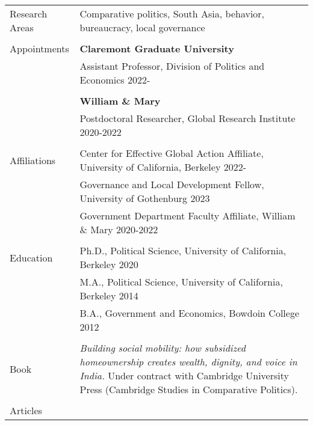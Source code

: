 \documentclass[letterpaper, 10.5pt]{article}
\begin{document}
\begin{longtable}{p{1.5in}p{5in}}

Research Areas & Comparative politics, South Asia,  behavior, bureaucracy, local governance \\
& \\
Appointments 
& \textbf{Claremont Graduate University} \hfill  \\
& Assistant Professor, Division of Politics and Economics \hfill  2022-\\

& \\

& \textbf{William \& Mary} \hfill \\
& Postdoctoral Researcher, Global Research Institute \hfill 2020-2022 \\


& \\

Affiliations & Center for Effective Global Action Affiliate, University of California,  Berkeley \hfill 2022-\\ 
& Governance and Local Development Fellow, University of Gothenburg \hfill 2023\\


& Government Department Faculty Affiliate, William \& Mary \hfill 2020-2022  \\
& \\
{Education} 
&Ph.D., Political Science, University of California, Berkeley \hfill 2020 \\


& M.A., Political Science, University of California, Berkeley \hfill 2014 \\
& B.A., Government and Economics, Bowdoin College  \hfill 2012 \\

& \\

Book &  \textit{Building social mobility: how subsidized homeownership creates wealth, dignity, and voice in India.} Under contract with Cambridge University Press (Cambridge Studies in Comparative Politics).\\

& \\

\nohyphens{{Articles}} 


\end{longtable}
\end{document}
